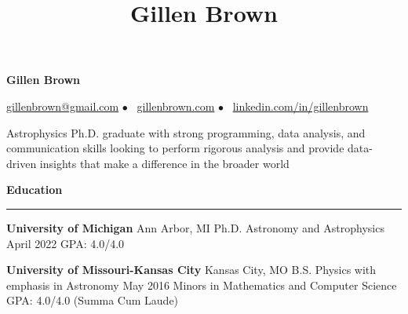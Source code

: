 \documentclass[10pt]{article}
\title{Gillen Brown}
\newcommand{\spacer}{$\bullet$ \ }
\newcommand{\header}[1]{\vspace{1.0em}\par \textbf{\large #1}\strut\hrule\vspace{-1.2em}}
\newcommand{\actionHeader}[2]{\vspace{1em}\textbf{#1} \hfill #2}
\newcommand{\indentedItemDate}[2]{\newline\null\qquad #1 \hfill #2}
\newcommand{\indentedItem}[1]{\newline\null\qquad #1}
\begin{document}
\thispagestyle{empty}


\begin{center}
{\LARGE \bf Gillen Brown}

{\normalsize \href{mailto:gillenbrown@gmail.com}{gillenbrown@gmail.com} \spacer \href{https://www.gillenbrown.com}{gillenbrown.com} \spacer \href{http://www.linkedin.com/in/gillenbrown}{linkedin.com/in/gillenbrown}}
\end{center}

\bigskip
Astrophysics Ph.D. graduate with strong programming, data analysis, and communication skills looking to perform rigorous analysis and provide data-driven insights that make a difference in the broader world

\header{Education}
\actionHeader{University of Michigan}{Ann Arbor, MI}
\indentedItemDate{Ph.D. Astronomy and Astrophysics}{April 2022}
\indentedItem{GPA: 4.0/4.0}
\vspace{-0.5em}

\actionHeader{University of Missouri-Kansas City}{Kansas City, MO}
\indentedItemDate{B.S. Physics with emphasis in Astronomy}{May 2016}
\indentedItem{Minors in Mathematics and Computer Science}
\indentedItem{GPA: 4.0/4.0  (Summa Cum Laude)}
\vspace{-0.3em}
\end{document}
